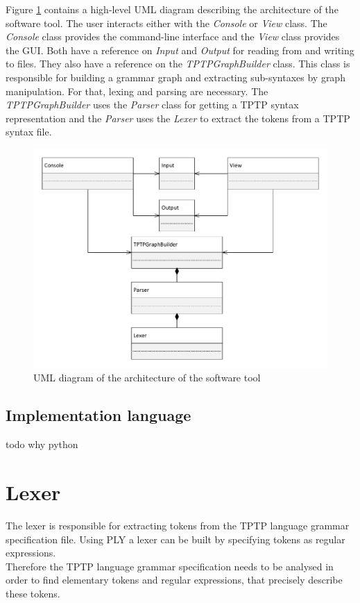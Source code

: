 Figure \ref{fig:ConceptArchitectureOverview} contains a high-level UML diagram describing the architecture of the software tool. The user interacts either with the \textit{Console} or \textit{View} class. The \textit{Console} class provides the command-line interface and the \textit{View} class provides the GUI. Both have a reference on \textit{Input} and \textit{Output} for reading from and writing to files. They also have a reference on the \textit{TPTPGraphBuilder} class. This class is responsible for building a grammar graph and extracting sub-syntaxes by graph manipulation. For that, lexing and parsing are necessary. The \textit{TPTPGraphBuilder} uses the \textit{Parser} class for getting a \ac{TPTP} syntax representation and the \textit{Parser} uses the \textit{Lexer} to extract the tokens from a \ac{TPTP} syntax file.
\begin{figure}[H]
\centering
\includegraphics[width=1\textwidth]{images/Concept_UML_Architecture_Overview.pdf}
\caption{UML diagram of the architecture of the software tool}
\label{fig:ConceptArchitectureOverview}
\end{figure}
\subsection{Implementation language}\label{sec:ConceptImplementationLanguage}
todo why python

\section{Lexer}\label{sec:ConceptLexer}
The lexer is responsible for extracting tokens from the TPTP language grammar specification file. Using \ac{PLY} a lexer can be built by specifying tokens as regular expressions.\\
Therefore the TPTP language grammar specification needs to be analysed in order to find elementary tokens and regular expressions, that precisely describe these
tokens. 

